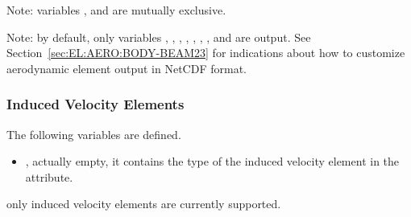 \bigskip
\noindent
Note: variables ,  and 
are mutually exclusive.

\bigskip
\noindent
Note: by default, only variables
,
,
,
,
,
,
,
and  are output.
See Section~\ref{sec:EL:AERO:BODY-BEAM23} for indications
about how to customize aerodynamic element output in NetCDF format.

\subsubsection{Induced Velocity Elements}
\label{sec:NetCDF:Elem:InducedVelocity}

The following variables are defined.
\begin{itemize}
  \item {}, actually empty, it contains the type of 
    the induced velocity element in the  attribute.
\end{itemize}
only  induced velocity elements are currently supported.
